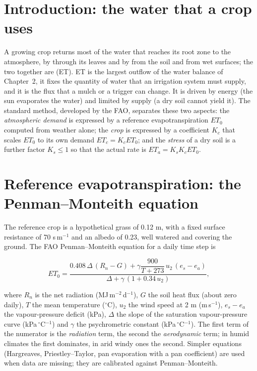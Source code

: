 \section{Introduction: the water that a crop uses}
A growing crop returns most of the water that reaches its root zone to the atmosphere, by  through its leaves and by  from the soil and from wet surfaces; the two together are  (ET). ET is the largest outflow of the water balance of Chapter~2, it fixes the quantity of water that an irrigation system must supply, and it is the flux that a mulch or a trigger can change. It is driven by energy (the sun evaporates the water) and limited by supply (a dry soil cannot yield it). The standard method, developed by the FAO, separates these two aspects: the \emph{atmospheric demand} is expressed by a reference evapotranspiration $ET_0$ computed from weather alone; the \emph{crop} is expressed by a coefficient $K_c$ that scales $ET_0$ to its own demand $ET_c=K_cET_0$; and the \emph{stress} of a dry soil is a further factor $K_s\le1$ so that the actual rate is $ET_a=K_sK_cET_0$.

\section{Reference evapotranspiration: the Penman--Monteith equation}
The reference crop is a hypothetical grass of 0.12 m, with a fixed surface resistance of 70 s\,m$^{-1}$ and an albedo of 0.23, well watered and covering the ground. The FAO Penman--Monteith equation for a daily time step is

\begin{equation}ET_0=\frac{0.408\,\Delta\,(R_n-G)+\gamma\dfrac{900}{T+273}\,u_2\,(e_s-e_a)}{\Delta+\gamma\,(1+0.34\,u_2)},\label{eq:pm}\end{equation}


where $R_n$ is the net radiation (MJ\,m$^{-2}$\,d$^{-1}$), $G$ the soil heat flux (about zero daily), $T$ the mean temperature ($^\circ$C), $u_2$ the wind speed at 2 m (m\,s$^{-1}$), $e_s-e_a$ the vapour-pressure deficit (kPa), $\Delta$ the slope of the saturation vapour-pressure curve (kPa\,$^\circ$C$^{-1}$) and $\gamma$ the psychrometric constant (kPa\,$^\circ$C$^{-1}$). The first term of the numerator is the \emph{radiation} term, the second the \emph{aerodynamic} term; in humid climates the first dominates, in arid windy ones the second. Simpler equations (Hargreaves, Priestley--Taylor, pan evaporation with a pan coefficient) are used when data are missing; they are calibrated against Penman--Monteith.


